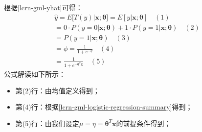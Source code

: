 \documentclass[UTF8]{article}
\begin{document}
根据\ref{lcrn-gml-yhat}可得：
\begin{equation}
\begin{aligned}
\hat{y}=E\Big[ T(y) \vert \boldsymbol{x}; \boldsymbol{\theta} \Big]=E[ y \vert \boldsymbol{x}; \boldsymbol{\theta} ] \quad (1) \\
= 0 \cdot P(y=0 \vert \boldsymbol{x}; \boldsymbol{\theta}) + 1 \cdot P(y=1 \vert \boldsymbol{x}; \boldsymbol{\theta}) \quad (2) \\
= P(y=1 \vert \boldsymbol{x}; \boldsymbol{\theta}) \quad (3) \\
= \phi = \frac{1}{1+e^{-\eta}} \quad (4) \\
= \frac{1}{1+e^{-\boldsymbol{\theta}^{T}\boldsymbol{x}}} \quad (5)
\end{aligned}
\label{lcrn-gml-yhat-deduction}
\end{equation}
公式解读如下所示：
\begin{itemize}
\item 第(2)行：由均值定义得到；
\item 第(4)行：根据\ref{lcrn-gml-logistic-regression-summary}得到；
\item 第(5)行：由我们设定$\mu=\eta=\boldsymbol{\theta}^{T}\boldsymbol{x}$的前提条件得到；
\end{itemize}
\end{document}
